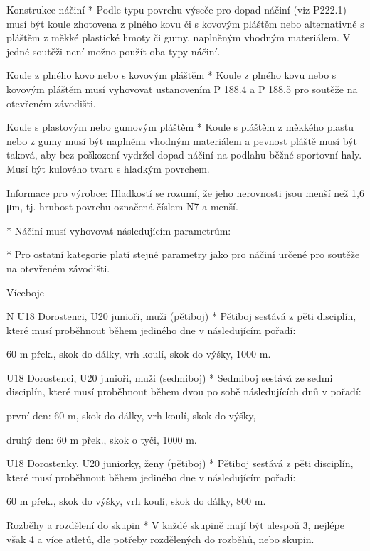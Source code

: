 Konstrukce náčiní
* Podle typu povrchu výseče pro dopad náčiní (viz P222.1) musí být koule zhotovena z plného kovu či s kovovým pláštěm nebo alternativně s pláštěm z měkké plastické hmoty či gumy, naplněným vhodným materiálem. V jedné soutěži není možno použít oba typy náčiní.

Koule z plného kovo nebo s kovovým pláštěm
* Koule z plného kovu nebo s kovovým pláštěm musí vyhovovat ustanovením P 188.4 a P 188.5 pro soutěže na otevřeném závodišti.

Koule s plastovým nebo gumovým pláštěm
* Koule s pláštěm z měkkého plastu nebo z gumy musí být naplněna vhodným materiálem a pevnost pláště musí být taková, aby bez poškození vydržel dopad náčiní na podlahu běžné sportovní haly. Musí být kulového tvaru s hladkým povrchem.

Informace pro výrobce: Hladkostí se rozumí, že jeho nerovnosti jsou menší než 1,6 μm, tj. hrubost povrchu označená číslem N7 a menší.

* Náčiní musí vyhovovat následujícím parametrům:


* Pro ostatní kategorie platí stejné parametry jako pro náčiní určené pro soutěže na otevřeném závodišti.
\enditems

\secc Víceboje

\begitems \style N
U18 Dorostenci, U20 junioři, muži (pětiboj)
* Pětiboj sestává z pěti disciplín, které musí proběhnout během jediného dne v následujícím pořadí:

60 m přek., skok do dálky, vrh koulí, skok do výšky, 1000 m.

U18 Dorostenci, U20 junioři, muži (sedmiboj)
* Sedmiboj sestává ze sedmi disciplín, které musí proběhnout během dvou po sobě následujících dnů v pořadí:

první den: 60 m, skok do dálky, vrh koulí, skok do výšky,

druhý den: 60 m přek., skok o tyči, 1000 m.

U18 Dorostenky, U20 juniorky, ženy (pětiboj)
* Pětiboj sestává z pěti disciplín, které musí proběhnout během jediného dne v následujícím pořadí:

60 m přek., skok do výšky, vrh koulí, skok do dálky, 800 m.

Rozběhy a rozdělení do skupin
* V každé skupině mají být alespoň 3, nejlépe však 4 a více atletů, dle potřeby rozdělených do rozběhů, nebo skupin.
\enditems

\endinput